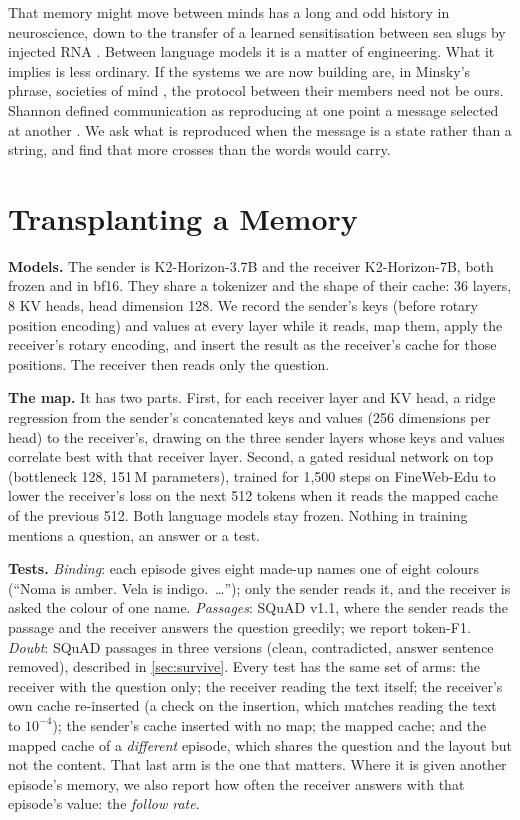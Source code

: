 \documentclass{article}
\begin{document}
That memory might move between minds has a long and odd history in neuroscience, down to the transfer of a learned sensitisation between sea slugs by injected RNA \citep{bedecarrats2018rna}. Between language models it is a matter of engineering. What it implies is less ordinary. If the systems we are now building are, in Minsky's phrase, societies of mind \citep{minsky1986society}, the protocol between their members need not be ours. Shannon defined communication as reproducing at one point a message selected at another \citep{shannon1948mathematical}. We ask what is reproduced when the message is a state rather than a string, and find that more crosses than the words would carry.

\section{Transplanting a Memory}
\label{sec:instrument}

\textbf{Models.} The sender is K2-Horizon-3.7B and the receiver K2-Horizon-7B, both frozen and in bf16. They share a tokenizer and the shape of their cache: 36 layers, 8 KV heads, head dimension 128. We record the sender's keys (before rotary position encoding) and values at every layer while it reads, map them, apply the receiver's rotary encoding, and insert the result as the receiver's cache for those positions. The receiver then reads only the question.

\textbf{The map.} It has two parts. First, for each receiver layer and KV head, a ridge regression from the sender's concatenated keys and values (256 dimensions per head) to the receiver's, drawing on the three sender layers whose keys and values correlate best with that receiver layer. Second, a gated residual network on top (bottleneck 128, 151\,M parameters), trained for 1,500 steps on FineWeb-Edu to lower the receiver's loss on the next 512 tokens when it reads the mapped cache of the previous 512. Both language models stay frozen. Nothing in training mentions a question, an answer or a test.

\textbf{Tests.} \emph{Binding}: each episode gives eight made-up names one of eight colours (``Noma is amber. Vela is indigo.\ \ldots''); only the sender reads it, and the receiver is asked the colour of one name. \emph{Passages}: SQuAD v1.1, where the sender reads the passage and the receiver answers the question greedily; we report token-F1. \emph{Doubt}: SQuAD passages in three versions (clean, contradicted, answer sentence removed), described in \cref{sec:survive}. Every test has the same set of arms: the receiver with the question only; the receiver reading the text itself; the receiver's own cache re-inserted (a check on the insertion, which matches reading the text to $10^{-4}$); the sender's cache inserted with no map; the mapped cache; and the mapped cache of a \emph{different} episode, which shares the question and the layout but not the content. That last arm is the one that matters. Where it is given another episode's memory, we also report how often the receiver answers with that episode's value: the \emph{follow rate}.
\end{document}
